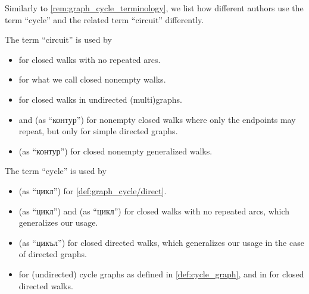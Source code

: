 \begin{remark}\label{rem:graph_cycle_terminology}
  Similarly to \cref{rem:graph_cycle_terminology}, we list how different authors use the term \enquote{cycle} and the related term \enquote{circuit} differently.

  \begin{thmenum}
     The term \enquote{circuit} is used by
    \begin{itemize}
      \item {} for closed walks with no repeated arcs.

      \item {} for what we call closed nonempty walks.

      \item {} for closed walks in undirected (multi)graphs.

      \item {} and  (as \enquote{контур}) for nonempty closed walks where only the endpoints may repeat, but only for simple directed graphs.

      \item {} (as \enquote{контур}) for closed nonempty generalized walks.
    \end{itemize}

     The term \enquote{cycle} is used by
    \begin{itemize}
      \item {} (as \enquote{цикл}) for \cref{def:graph_cycle/direct}.

      \item {} (as \enquote{цикл}) and  (as \enquote{цикл}) for closed walks with no repeated arcs, which generalizes our usage.

      \item {} (as \enquote{цикъл}) for closed directed walks, which generalizes our usage in the case of directed graphs.

      \item {} for (undirected) cycle graphs as defined in \cref{def:cycle_graph}, and in \cite[def. 10.4.2]{Rosen2019DiscreteMathematics} for closed directed walks.


\end{itemize}
\end{thmenum}
\end{remark}
